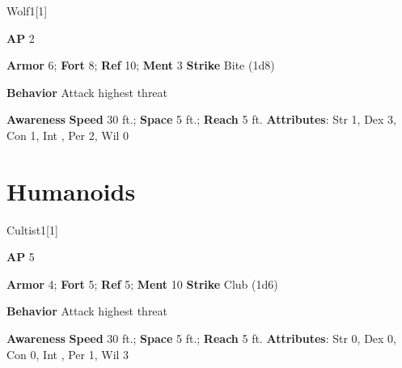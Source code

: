 \begin{monsection}{Wolf}{1}[1]
\vspace{-1em}\vspace{-1em}
\begin{spellcontent}
\begin{spelltargetinginfo}
{\textbf{AP} 2}

\pari \textbf{Armor} 6;
\textbf{Fort} 8;
\textbf{Ref} 10;
\textbf{Ment} 3
\pari \textbf{Strike} Bite  (1d8)



\pari \textbf{Behavior} Attack highest threat
\end{spelltargetinginfo}
\end{spellcontent}

\begin{monsterfooter}
\pari \textbf{Awareness} 
\pari \textbf{Speed} 30 ft.;
\textbf{Space} 5 ft.;
\textbf{Reach} 5 ft.
\pari \textbf{Attributes}:
Str 1,
Dex 3,
Con 1,
Int ,
Per 2,
Wil 0
\end{monsterfooter}
\end{monsection}

\section{Humanoids}
\begin{monsection}{Cultist}{1}[1]
\vspace{-1em}\vspace{-1em}
\begin{spellcontent}
\begin{spelltargetinginfo}
{\textbf{AP} 5}

\pari \textbf{Armor} 4;
\textbf{Fort} 5;
\textbf{Ref} 5;
\textbf{Ment} 10
\pari \textbf{Strike} Club  (1d6)



\pari \textbf{Behavior} Attack highest threat
\end{spelltargetinginfo}
\end{spellcontent}

\begin{monsterfooter}
\pari \textbf{Awareness} 
\pari \textbf{Speed} 30 ft.;
\textbf{Space} 5 ft.;
\textbf{Reach} 5 ft.
\pari \textbf{Attributes}:
Str 0,
Dex 0,
Con 0,
Int ,
Per 1,
Wil 3
\end{monsterfooter}
\end{monsection}


